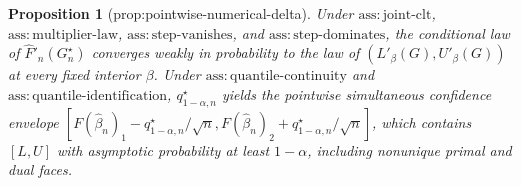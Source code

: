 \documentclass{article}
\newtheorem{proposition}{Proposition}
\begin{document}
\begin{proposition}[prop:pointwise-numerical-delta]\label{prop:pointwise-numerical-delta}
Under \(\mathrm{ass:joint\text{-}clt}\), \(\mathrm{ass:multiplier\text{-}law}\), \(\mathrm{ass:step\text{-}vanishes}\), and \(\mathrm{ass:step\text{-}dominates}\), the conditional law of \(\widehat F'_n(G_n^\star)\) converges weakly in probability to the law of \((L'_\beta(G),U'_\beta(G))\) at every fixed interior \(\beta\). Under \(\mathrm{ass:quantile\text{-}continuity}\) and \(\mathrm{ass:quantile\text{-}identification}\), \(q_{1-\alpha,n}^\star\) yields the pointwise simultaneous confidence envelope \([F(\widehat\beta_n)_1-q_{1-\alpha,n}^\star/\sqrt n,F(\widehat\beta_n)_2+q_{1-\alpha,n}^\star/\sqrt n]\), which contains \([L,U]\) with asymptotic probability at least \(1-\alpha\), including nonunique primal and dual faces.
\end{proposition}
\end{document}
